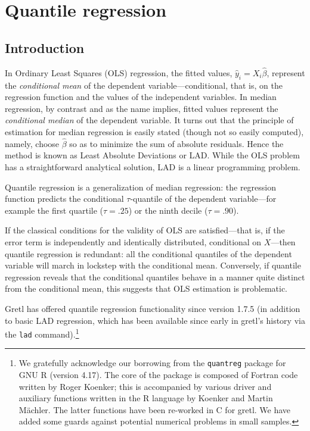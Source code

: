 \chapter{Quantile regression}
\label{chap:quantreg}

\section{Introduction}
\label{sec:rq-intro}

In Ordinary Least Squares (OLS) regression, the fitted values,
$\hat{y}_i = X_i\hat{\beta}$, represent the \emph{conditional mean} of
the dependent variable---conditional, that is, on the regression
function and the values of the independent variables.  In median
regression, by contrast and as the name implies, fitted values
represent the \emph{conditional median} of the dependent variable.  It
turns out that the principle of estimation for median regression is
easily stated (though not so easily computed), namely, choose
$\hat{\beta}$ so as to minimize the sum of absolute residuals.  Hence
the method is known as Least Absolute Deviations or LAD.  While the OLS
problem has a straightforward analytical solution, LAD is a linear
programming problem.

Quantile regression is a generalization of median regression: the
regression function predicts the conditional $\tau$-quantile of the
dependent variable---for example the first quartile ($\tau = .25$)
or the ninth decile ($\tau = .90$).

If the classical conditions for the validity of OLS are
satisfied---that is, if the error term is independently and
identically distributed, conditional on $X$---then quantile regression
is redundant: all the conditional quantiles of the dependent variable
will march in lockstep with the conditional mean.  Conversely, if
quantile regression reveals that the conditional quantiles behave in a
manner quite distinct from the conditional mean, this suggests that
OLS estimation is problematic.

Gretl has offered quantile regression functionality since version
1.7.5 (in addition to basic LAD regression, which has been available
since early in gretl's history via the \texttt{lad}
command).\footnote{We gratefully acknowledge our borrowing from the
  \texttt{quantreg} package for GNU \textsf{R} (version 4.17).  The
  core of the package is composed of Fortran code written by Roger
  Koenker; this is accompanied by various driver and auxiliary
  functions written in the \textsf{R} language by Koenker and Martin
  M\"achler.  The latter functions have been re-worked in C for gretl.
  We have added some guards against potential numerical problems in
  small samples.}

